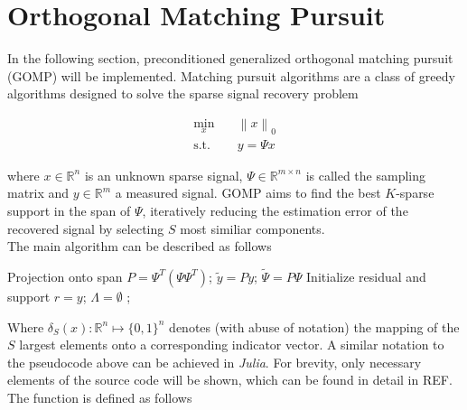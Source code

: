 \section{Orthogonal Matching Pursuit}
\label{JM:sec:GOMP}

In the following section, preconditioned generalized orthogonal matching pursuit (GOMP) \cite{JMTongEtAl2020} will be implemented.
Matching pursuit algorithms are a class of greedy algorithms designed to solve the sparse signal recovery problem

\begin{equation}
\begin{aligned}
    \min_x \quad & \left\lVert x \right\rVert_0 \\
    \textrm{s.t.} \quad & y = \Psi x
\end{aligned}
\end{equation}

where $x \in \mathbb{R}^n$ is an unknown sparse signal, $\Psi \in \mathbb{R}^{m \times n}$ is called the sampling matrix and $y \in \mathbb{R}^m$
a measured signal. GOMP aims to find the best $K$-sparse support in the span of $\Psi$, iteratively reducing the estimation error of the recovered signal by selecting $S$ most similiar components.\\

The main algorithm can be described as follows

\begin{algorithm}[H]
    \SetAlgoLined
    Projection onto span\; 
    $P = \Psi^T \left(\Psi\Psi^T\right)$;
    $\tilde{y} = P y$;
    $\tilde{\Psi} = P \Psi$\;
    Initialize residual and support\;
    $r = y$;
    $\Lambda = \emptyset$\;
    ;
\end{algorithm}

Where $\delta_S\left( x \right) : \mathbb{R}^n \mapsto \lbrace 0, 1 \rbrace^n$ denotes (with abuse of notation) the mapping of the $S$ largest elements onto a corresponding
indicator vector. A similar notation to the pseudocode above can be achieved in \textit{Julia}. For brevity, only necessary elements of the source code will be shown, which can be found in detail in REF. The function is defined as follows

